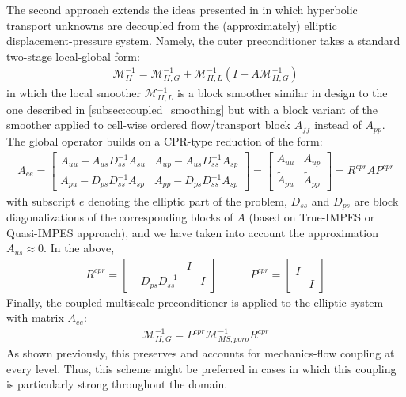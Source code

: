 The second approach extends the ideas presented in \cite{Klevtsov2016} in which hyperbolic transport unknowns are decoupled from the (approximately) elliptic displacement-pressure system.
Namely, the outer preconditioner takes a standard two-stage local-global form:
\begin{align}
    \mathcal{M}_{II}^{-1} = \mathcal{M}_{II,G}^{-1} + \mathcal{M}_{II,L}^{-1}\left(I - A \mathcal{M}_{II,G}^{-1}\right)
\end{align}
in which the local smoother $\mathcal{M}_{II,L}^{-1}$ is a block smoother similar in design to the one described in \cref{subsec:coupled_smoothing} but with a block variant of the smoother applied to cell-wise ordered flow/transport block $A_{ff}$ instead of $A_{pp}$.   The global operator builds on a CPR-type reduction of the form:
\begin{align}
    A_{ee} =
    \begin{bmatrix}
        A_{uu} - A_{us} D_{ss}^{-1} A_{su} & A_{up} - A_{us} D_{ss}^{-1} A_{sp} \\
        A_{pu} - D_{ps} D_{ss}^{-1} A_{sp} & A_{pp} - D_{ps} D_{ss}^{-1} A_{sp}
    \end{bmatrix}
    =
    \begin{bmatrix}
        A_{uu}         & A_{up} \\
        \tilde{A}_{pu} & \tilde{A}_{pp}
    \end{bmatrix}
    = R^{cpr} A P^{cpr}
\end{align}
with subscript $e$ denoting the elliptic part of the problem, $D_{ss}$ and $D_{ps}$ are block diagonalizations of the corresponding blocks of $A$ (based on True-IMPES or Quasi-IMPES approach), and we have taken into account the approximation $A_{us} \approx 0$.   In the above,
\begin{align}
    R^{cpr} = 
    \begin{bmatrix}
                             & I &   \\
        - D_{ps} D_{ss}^{-1} &   & I
    \end{bmatrix}
    \quad\quad\quad
    P^{cpr} =
    \begin{bmatrix}
          &   \\
        I &   \\
          & I 
    \end{bmatrix}
\end{align}
Finally, the coupled multiscale preconditioner is applied to the elliptic system with matrix $A_{ee}$:
\begin{align}
    \mathcal{M}_{II,G}^{-1} = P^{cpr} \mathcal{M}_{MS,poro}^{-1} R^{cpr}
\end{align}
As shown previously, this preserves and accounts for mechanics-flow coupling at every level.   Thus, this scheme might be preferred in cases in which this coupling is particularly strong throughout the domain.

